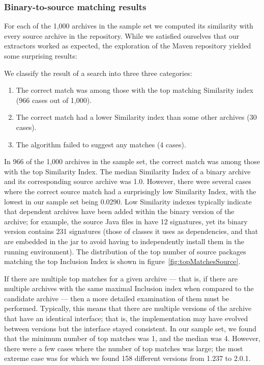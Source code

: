 \subsubsection{Binary-to-source matching results}

For each of the 1,000 archives in the sample set we computed its similarity
with every source archive in the repository.  While we satisfied ourselves
that our extractors worked as expected, the exploration of the Maven
repository yielded some surprising results:

We classify the result of a search into three three categories:

    \begin{enumerate}
    \item The correct match was among those with the top matching Similarity
	index (966 cases out of 1,000).
    \item The correct match had a lower Similarity index than some
	other archives (30 cases).
    \item The algorithm failed to suggest any matches (4 cases).
    \end{enumerate}

In 966 of the 1,000 archives in the sample set, the correct match was among
those with the top Similarity Index.  The median Similarity Index of a
binary archive and its corresponding source archive was 1.0.  However,
there were several cases where the correct source match had a surprisingly
low Similarity Index, with the lowest in our sample set being 0.0290.  Low
Similarity indexes typically indicate that dependent archives have been
added within the binary version of the archive; for example, the source
Java files in  have 12 signatures, yet
its binary version contains 231 signatures (those of classes it uses as
dependencies, and that are embedded in the jar to avoid having to
independently install them in the running environment).  The distribution
of the top number of source packages matching the top Inclusion Index is
shown in figure~\ref{fig:topMatchesSource}.  

If there are multiple top matches for a given archive --- that is, if there
are multiple archives with the same maximal Inclusion index when compared
to the candidate archive --- then a more detailed examination of them must
be performed.  Typically, this means that there are multiple versions of
the archive that have an identical interface; that is, the implementation
may have evolved between versions but the interface stayed consistent.  In
our sample set, we found that the minimum number of top matches was 1, and
the median was 4.  However, there were a few cases where the number of top
matches was large; the most extreme case was
 for which we found 158 different
versions from 1.237 to 2.0.1.  

